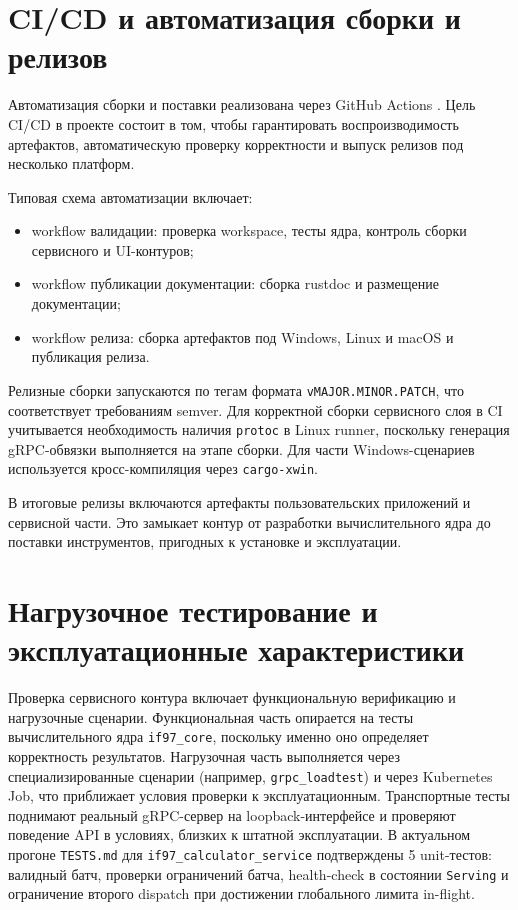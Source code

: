 \section{CI/CD и автоматизация сборки и релизов}

Автоматизация сборки и поставки реализована через GitHub Actions \cite{github_actions_docs}.  
Цель CI/CD в проекте состоит в том, чтобы гарантировать воспроизводимость артефактов, автоматическую проверку корректности и выпуск релизов под несколько платформ.  

Типовая схема автоматизации включает:
\begin{itemize}
\item workflow валидации: проверка workspace, тесты ядра, контроль сборки сервисного и UI-контуров;  
\item workflow публикации документации: сборка rustdoc и размещение документации;  
\item workflow релиза: сборка артефактов под Windows, Linux и macOS и публикация релиза.  
\end{itemize}

Релизные сборки запускаются по тегам формата \texttt{vMAJOR.MINOR.PATCH}, что соответствует требованиям semver.  
Для корректной сборки сервисного слоя в CI учитывается необходимость наличия \texttt{protoc} в Linux runner, поскольку генерация gRPC-обвязки выполняется на этапе сборки.  
Для части Windows-сценариев используется кросс-компиляция через \texttt{cargo-xwin}.  

В итоговые релизы включаются артефакты пользовательских приложений и сервисной части.  
Это замыкает контур от разработки вычислительного ядра до поставки инструментов, пригодных к установке и эксплуатации.  

\section{Нагрузочное тестирование и эксплуатационные характеристики}

Проверка сервисного контура включает функциональную верификацию и нагрузочные сценарии.  
Функциональная часть опирается на тесты вычислительного ядра \texttt{if97\_core}, поскольку именно оно определяет корректность результатов.  
Нагрузочная часть выполняется через специализированные сценарии (например, \texttt{grpc\_loadtest}) и через Kubernetes Job, что приближает условия проверки к эксплуатационным.  
Транспортные тесты поднимают реальный gRPC-сервер
на loopback-интерфейсе
и проверяют поведение API в условиях,
близких к штатной эксплуатации.
В актуальном прогоне \texttt{TESTS.md}
для \texttt{if97\_calculator\_service}
подтверждены 5 unit-тестов:
валидный батч, проверки ограничений батча,
health-check в состоянии \texttt{Serving}
и ограничение второго dispatch
при достижении глобального лимита in-flight.

